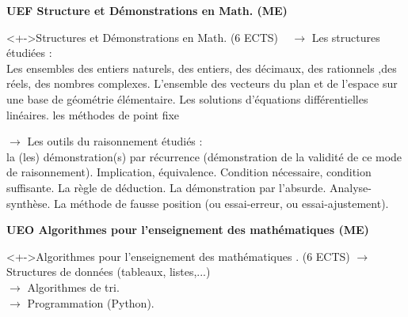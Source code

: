 \documentclass{beamer}
\begin{document}
\begin{frame}
{\bf UEF Structure et Démonstrations en Math. (ME) }
\begin{block}<+->{Structures et Démonstrations en Math.  (6 ECTS) \ } 
$\to$ Les  structures étudiées :\\
  Les ensembles des entiers naturels, des entiers, des décimaux, des rationnels ,des réels,
des nombres complexes.  L'ensemble des vecteurs du plan et de l'espace sur une base de géométrie élémentaire.  Les solutions d'équations différentielles linéaires. les méthodes de point fixe

$\to$ Les outils du raisonnement étudiés :\\
  la (les) démonstration(s) par récurrence (démonstration de la validité de ce mode de
raisonnement). Implication, équivalence. Condition nécessaire, condition suffisante. La règle de déduction. La démonstration par l'absurde. Analyse-synthèse. La méthode de fausse position (ou essai-erreur, ou essai-ajustement).


\end{block}
\end{frame}




\begin{frame}
{\bf UEO Algorithmes pour l'enseignement des mathématiques  (ME)}
\begin{block}<+->{Algorithmes pour l'enseignement des mathématiques .   (6 ECTS) } 
$\to$ Structures de données (tableaux, listes,...)\\
$\to$ Algorithmes de tri.\\
$\to$ Programmation (Python).
\end{block}
\end{frame}
\end{document}
